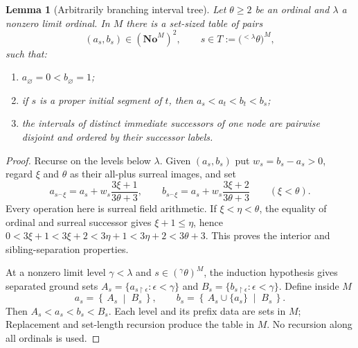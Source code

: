 \documentclass[11pt,letterpaper]{article}
\numberwithin{equation}{section}
\newtheorem{lemma}[lemma]{Lemma}
\theoremstyle{definition}
\theoremstyle{remark}
\newcommand{\No}{\mathbf{No}}
\newcommand{\NoM}{\No^{M}}
\newcommand{\res}{\mathbin{\upharpoonright}}
\newcommand{\cut}[2]{\left\{\,#1\;\middle|\;#2\,\right\}}
\begin{document}
\begin{lemma}[Arbitrarily branching interval tree]\label{univ:lem:tree}
Let $\theta\geq2$ be an ordinal and $\lambda$ a nonzero limit ordinal. In $M$
there is a set-sized table of pairs
\[
 (a_s,b_s)\in(\NoM)^2,
 \qquad s\in T:=\bigl({}^{<\lambda}\theta\bigr)^M,
\]
such that:
\begin{enumerate}[label=\textnormal{(\roman*)}]
\item $a_\varnothing=0<b_\varnothing=1$;
\item if $s$ is a proper initial segment of $t$, then $a_s<a_t<b_t<b_s$;
\item the intervals of distinct immediate successors of one node are pairwise
disjoint and ordered by their successor labels.
\end{enumerate}
\end{lemma}
\begin{proof}
Recurse on the levels below $\lambda$. Given $(a_s,b_s)$ put $w_s=b_s-a_s>0$,
regard $\xi$ and $\theta$ as their all-plus surreal images, and set
\begin{equation}\label{univ:eq:split}
 a_{s^\frown\xi}=a_s+w_s\frac{3\xi+1}{3\theta+3},\qquad
 b_{s^\frown\xi}=a_s+w_s\frac{3\xi+2}{3\theta+3}
 \qquad(\xi<\theta).
\end{equation}
Every operation here is surreal field arithmetic. If $\xi<\eta<\theta$, the
equality of ordinal and surreal successor gives $\xi+1\leq\eta$, hence
$0<3\xi+1<3\xi+2<3\eta+1<3\eta+2<3\theta+3$. This proves the interior and
sibling-separation properties.

At a nonzero limit level $\gamma<\lambda$ and $s\in({}^\gamma\theta)^M$, the
induction hypothesis gives separated ground sets
$A_s=\{a_{s\res\epsilon}:\epsilon<\gamma\}$ and
$B_s=\{b_{s\res\epsilon}:\epsilon<\gamma\}$. Define inside $M$
\begin{equation}\label{univ:eq:limitinterval}
 a_s=\cut{A_s}{B_s},\qquad
 b_s=\cut{A_s\cup\{a_s\}}{B_s}.
\end{equation}
Then $A_s<a_s<b_s<B_s$. Each level and its prefix data are sets in $M$;
Replacement and set-length recursion produce the table in $M$. No recursion
along all ordinals is used.
\end{proof}
\end{document}
